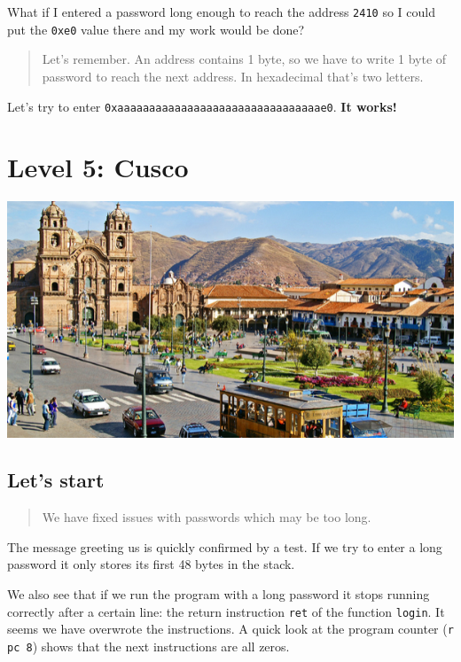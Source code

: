 What if I entered a password long enough to reach the address
\texttt{2410} so I could put the \texttt{0xe0} value there and my work
would be done?

\begin{quote}
Let's remember. An address contains 1 byte, so we have to write 1 byte
of password to reach the next address. In hexadecimal that's two
letters.
\end{quote}

Let's try to enter \texttt{0xaaaaaaaaaaaaaaaaaaaaaaaaaaaaaaaae0}.
\textbf{It works!}

\section{Level 5: Cusco}\label{level-5-cusco}

\includegraphics{img/5_1.PNG}

\subsection{Let's start}\label{lets-start}

\begin{quote}
We have fixed issues with passwords which may be too long.
\end{quote}

The message greeting us is quickly confirmed by a test. If we try to
enter a long password it only stores its first 48 bytes in the stack.

We also see that if we run the program with a long password it stops
running correctly after a certain line: the return instruction
\texttt{ret} of the function \texttt{login}. It seems we have overwrote
the instructions. A quick look at the program counter (\texttt{r pc 8})
shows that the next instructions are all zeros.

